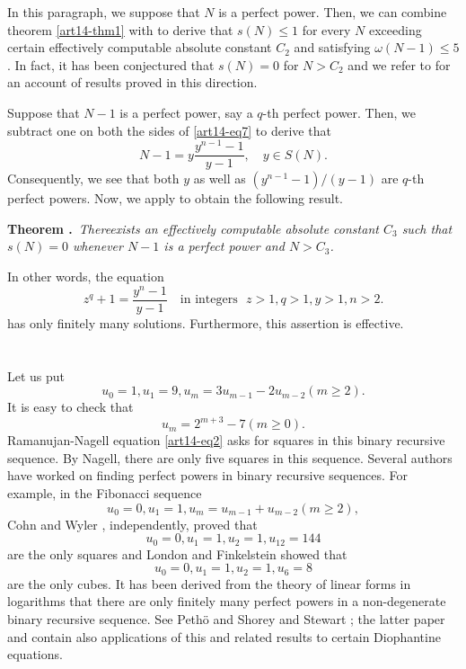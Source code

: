 In this paragraph, we suppose that $N$ is a perfect power. Then, we can combine theorem \ref{art14-thm1} with \cite[theorem 5(iv)]{art14-key32} to derive that $s(N)\leq 1$ for every $N$ exceeding certain effectively computable absolute constant $C_{2}$ and satisfying $\omega(N-1)\leq 5$. In fact, it has been conjectured that $s(N)=0$ for $N>C_{2}$ and we refer to \cite{art14-key27} for an account of results proved in this direction.

Suppose that $N-1$ is a perfect power, say a $q$-th perfect power. Then, we subtract one on both the sides of \eqref{art14-eq7} to derive that
$$
N-1=y\frac{y^{n-1}-1}{y-1},\quad y\in S(N).
$$ 
Consequently, we see that both $y$ as well as $(y^{n-1}-1)/(y-1)$ are $q$-th perfect powers. Now, we apply \cite[theorem 3]{art14-key25} to obtain the following result.

\medskip
\noindent
{\bf Theorem .\label{art14-thm2}}~{\em There\pageoriginale exists an effectively computable absolute constant $C_{3}$ such that $s(N)=0$ whenever $N-1$ is a perfect power and $N>C_{3}$.}

In other words, the equation
$$
z^{q}+1=\dfrac{y^{n}-1}{y-1}\quad\text{in integers~ } z>1, q>1, y>1, n>2.
$$
has only finitely many solutions. Furthermore, this assertion is effective. 

\section{}\label{art14-sec2}
Let us put
$$
u_{0}=1, u_{1}=9, u_{m}=3u_{m-1}-2u_{m-2}(m\geq 2).
$$
It is easy to check that
$$
u_{m}=2^{m+3}-7(m\geq 0).
$$
Ramanujan-Nagell equation \eqref{art14-eq2} asks for squares in this binary recursive sequence. By Nagell, there are only five squares in this sequence. Several authors have worked on finding perfect powers in binary recursive sequences. For example, in the Fibonacci sequence
$$
u_{0}=0, u_{1}=1, u_{m}=u_{m-1}+u_{m-2}(m\geq 2),
$$
Cohn \cite{art14-key5} and Wyler \cite{art14-key37}, independently, proved that
$$
u_{0}=0, u_{1}=1, u_{2}=1, u_{12}=144
$$
are the only squares and London and Finkelstein \cite{art14-key12} showed that
$$
u_{0}=0, u_{1}=1, u_{2}=1, u_{6}=8
$$
are the only cubes. It has been derived from the theory of linear forms in logarithms that there are only finitely many perfect powers in a non-degenerate binary recursive sequence. See Peth\"o \cite{art14-key18} and Shorey and Stewart \cite{art14-key30}; the latter paper and \cite{art14-key31} contain also applications of this and related results to certain Diophantine equations.

